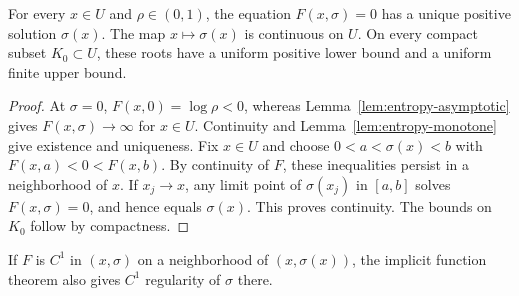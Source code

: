\begin{proposition}\label{prop:local-bandwidth}
For every $x\in U$ and $\rho\in(0,1)$, the equation $F(x,\sigma)=0$ has a unique positive solution $\sigma(x)$. The map $x\mapsto\sigma(x)$ is continuous on $U$. On every compact subset $K_0\subset U$, these roots have a uniform positive lower bound and a uniform finite upper bound.
\end{proposition}
\begin{proof}
At $\sigma=0$, $F(x,0)=\log\rho<0$, whereas Lemma~\ref{lem:entropy-asymptotic} gives $F(x,\sigma)\to\infty$ for $x\in U$. Continuity and Lemma~\ref{lem:entropy-monotone} give existence and uniqueness. Fix $x\in U$ and choose $0<a<\sigma(x)<b$ with $F(x,a)<0<F(x,b)$. By continuity of $F$, these inequalities persist in a neighborhood of $x$. If $x_j\to x$, any limit point of $\sigma(x_j)$ in $[a,b]$ solves $F(x,\sigma)=0$, and hence equals $\sigma(x)$. This proves continuity. The bounds on $K_0$ follow by compactness.
\end{proof}
If $F$ is $C^1$ in $(x,\sigma)$ on a neighborhood of $(x,\sigma(x))$, the implicit function theorem also gives $C^1$ regularity of $\sigma$ there.

